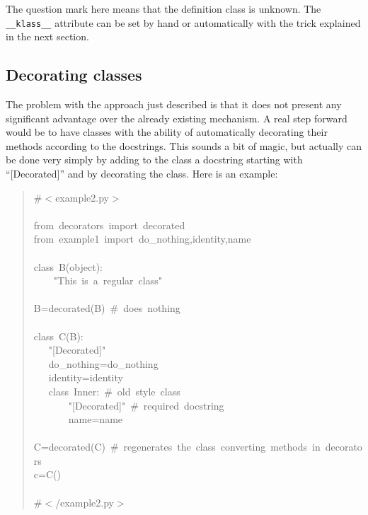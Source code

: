 \documentclass[11pt,english]{article}
\begin{document}
The question mark here means that the definition class is unknown.
The \texttt{{\_}{\_}klass{\_}{\_}} attribute can be set by hand or automatically
with the trick explained in the next section.



\hypertarget{decorating-classes}{}
\subsection*{Decorating classes}

The problem with the approach just described 
is that it does not present any significant advantage over 
the already existing mechanism. A real step forward would be to
have classes with the ability of automatically decorating their 
methods according to the docstrings. 
This sounds a bit of magic, but actually can be done very simply 
by adding to the class a docstring starting with ``[Decorated]''
and by decorating the class. 
Here is an example:
\begin{quote}
\begin{ttfamily}\begin{flushleft}
\mbox{{\#}{$<$}example2.py{$>$}}\\
\mbox{}\\
\mbox{from~decorators~import~decorated}\\
\mbox{from~example1~import~do{\_}nothing,identity,name}\\
\mbox{}\\
\mbox{class~B(object):}\\
\mbox{~~~~"This~is~a~regular~class"}\\
\mbox{}\\
\mbox{B=decorated(B)~{\#}~does~nothing}\\
\mbox{}\\
\mbox{class~C(B):}\\
\mbox{~~~"[Decorated]"}\\
\mbox{~~~do{\_}nothing=do{\_}nothing}\\
\mbox{~~~identity=identity}\\
\mbox{~~~class~Inner:~{\#}~old~style~class}\\
\mbox{~~~~~~~"[Decorated]"~{\#}~required~docstring~~~}\\
\mbox{~~~~~~~name=name}\\
\mbox{}\\
\mbox{C=decorated(C)~{\#}~regenerates~the~class~converting~methods~in~decorators}\\
\mbox{c=C()}\\
\mbox{}\\
\mbox{{\#}{$<$}/example2.py{$>$}}
\end{flushleft}\end{ttfamily}
\end{quote}
\end{document}
